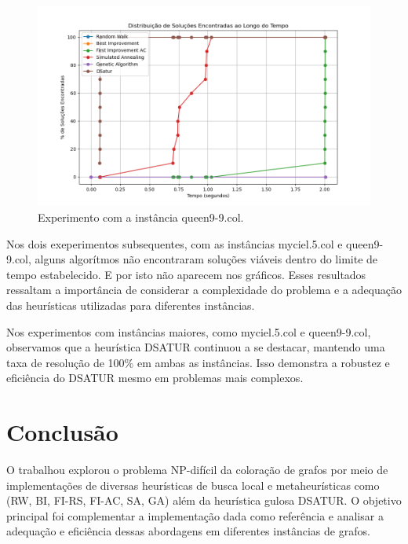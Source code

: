 \documentclass[12pt,a4paper]{article}
\begin{document}
\begin{figure}[H]
    \centering
    \includegraphics[width=1\textwidth]{./img/output-queen9-9.png}
    \caption{Experimento com a instância queen9-9.col.}
    \label{fig:experimento-queen9-9}
\end{figure}

Nos dois exeperimentos subsequentes, com as instâncias myciel.5.col e queen9-9.col, alguns algorítmos não encontraram soluções viáveis dentro do limite de tempo estabelecido. E por isto não aparecem nos gráficos. Esses resultados ressaltam a importância de considerar a complexidade do problema e a adequação das heurísticas utilizadas para diferentes instâncias.

Nos experimentos com instâncias maiores, como myciel.5.col e queen9-9.col, observamos que a heurística DSATUR continuou a se destacar, mantendo uma taxa de resolução de 100\% em ambas as instâncias. Isso demonstra a robustez e eficiência do DSATUR mesmo em problemas mais complexos.

\section{Conclusão}
O trabalhou explorou o problema NP-difícil da coloração de grafos por meio de implementações de diversas heurísticas de busca local e metaheurísticas como (RW, BI, FI-RS, FI-AC, SA, GA) além da heurística gulosa DSATUR. O objetivo principal foi complementar a implementação dada como referência e analisar a adequação e eficiência dessas abordagens em diferentes instâncias de grafos.
\end{document}
